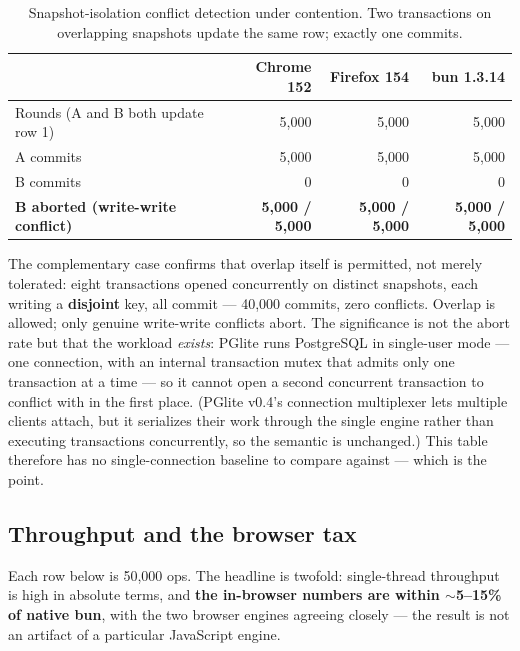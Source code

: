 \documentclass[11pt]{article}
\begin{document}
\begin{table}[htbp]
\centering
\caption{Snapshot-isolation conflict detection under contention. Two transactions
on overlapping snapshots update the same row; exactly one commits.}
\label{tab:si}
\begin{tabular}{lrrr}
\toprule
 & \textbf{Chrome 152} & \textbf{Firefox 154} & \textbf{bun 1.3.14} \\
\midrule
Rounds (A and B both update row 1) & 5,000 & 5,000 & 5,000 \\
A commits & 5,000 & 5,000 & 5,000 \\
B commits & 0 & 0 & 0 \\
\textbf{B aborted (write-write conflict)} & \textbf{5,000 / 5,000} & \textbf{5,000 / 5,000} & \textbf{5,000 / 5,000} \\
\bottomrule
\end{tabular}
\end{table}

The complementary case confirms that overlap itself is permitted, not merely
tolerated: eight transactions opened concurrently on distinct snapshots, each
writing a \textbf{disjoint} key, all commit --- 40,000 commits, zero conflicts.
Overlap is allowed; only genuine write-write conflicts abort. The significance is
not the abort rate but that the workload \emph{exists}: PGlite runs PostgreSQL in
single-user mode --- one connection, with an internal transaction mutex that admits
only one transaction at a time --- so it cannot open a second concurrent transaction
to conflict with in the first place. (PGlite v0.4's connection multiplexer lets
multiple clients attach, but it serializes their work through the single engine
rather than executing transactions concurrently, so the semantic is unchanged.) This
table therefore has no single-connection baseline to compare against --- which is
the point.

\subsection{Throughput and the browser tax}

Each row below is 50,000 ops. The headline is twofold: single-thread throughput is
high in absolute terms, and \textbf{the in-browser numbers are within
$\sim$5--15\% of native bun}, with the two browser engines agreeing closely --- the
result is not an artifact of a particular JavaScript engine.
\end{document}

